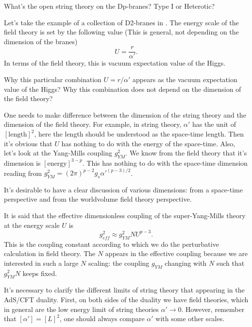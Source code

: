 \begin{question}
	What's the open string theory on the Dp-branes?
	Type I or Heterotic?
\end{question}

Let's take the example of a collection of D2-branes in .
The energy scale of the field theory is set by the following value
(This is general, not depending on the dimension of the branes)
\[
U = \frac{r}{\alpha'}
.\] 
In terms of the field theory, this is vacuum expectation value of the Higgs.

\begin{question}
Why this particular combination $U=r / \alpha'$ appears as
the vacuum expectation value of the Higgs?
Why this combination does not depend on the dimension of the field theory?
\end{question}

\begin{wrong}
One needs to make difference between the dimension of the string theory
and the dimension of the field theory.
For example, in string theory,
$\alpha'$ has the unit of $[\text{length}]^{2}$,
here the length should be understood as the space-time length.
Then it's obvious that $U$ has nothing to do with the energy of the space-time.
Also, let's look at the Yang-Mills coupling $g_{YM}^2$.
We know from the field theory that 
it's dimension is $[\text{energy}]^{3-p}$.
This has nothing to do with the space-time dimension reading from
$ g_{YM}^2 = (2\pi)^{p-2} g_s {\alpha'}^{(p-3) / 2}$.
\end{wrong}

\begin{todo}
It's desirable to have a clear discussion of various dimensions: from a space-time perspective and from the worldvolume field theory perspective.
\end{todo}

\begin{info}
It is said that the effective dimensionless coupling of the super-Yang-Mills
theory at the energy scale $U$ is
\[
	g_{eff}^2 \approx g^2_{YM} N U^{p-3}
.\] 
This is the coupling constant according to which we do the perturbative calculation in field theory.
The $N$ appears in the effective coupling because we are interested in such a large $N$ scaling: the coupling $g_{YM}$ changing with $N$ such that $g_{YM}^2 N$ keeps fixed.
\end{info}

It's necessary to clarify the different limits of string theory
that appearing in the AdS/CFT duality.
First, on both sides of the duality we have field theories,
which in general are the low energy limit of string theories
$\alpha'\to 0$.
However, remember that $[\alpha'] = [L]^2$,
one should always compare $\alpha'$ with some other scales.

